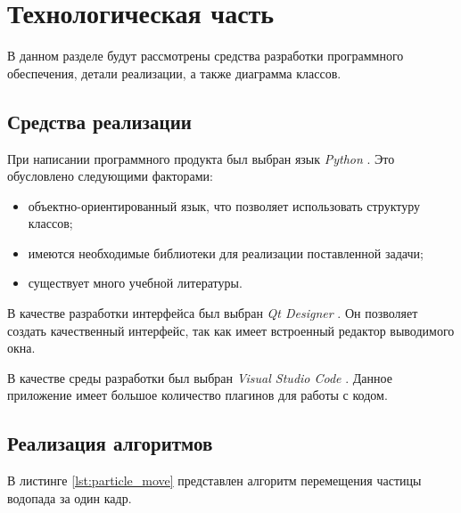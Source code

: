 \chapter{Технологическая часть}

В данном разделе будут рассмотрены средства разработки программного обеспечения, детали реализации, а также диаграмма классов.


\section{Средства реализации}

При написании программного продукта был выбран язык \textit{Python} \cite{python-lang}. Это обусловлено следующими факторами:

\begin{itemize}
    \item объектно-ориентированный язык, что позволяет использовать структуру классов;
    \item имеются необходимые библиотеки для реализации поставленной задачи;
    \item существует много учебной литературы.
\end{itemize}

В качестве разработки интерфейса был выбран \textit{Qt Designer} \cite{qt-designer}. Он позволяет создать качественный интерфейс, так как имеет встроенный редактор выводимого окна.

В качестве среды разработки был выбран \textit{Visual Studio Code} \cite{vs-code}. Данное приложение имеет большое количество плагинов для работы с кодом.


\section{Реализация алгоритмов}

В листинге \ref{lst:particle_move} представлен алгоритм перемещения частицы водопада за один кадр.

